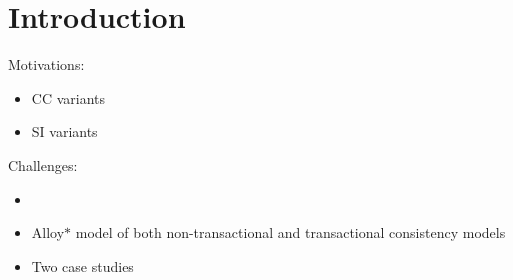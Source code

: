 
\section{Introduction} \label{section:intro}

Motivations:
\begin{itemize}
  \item CC variants
  \item SI variants
\end{itemize}

Challenges:
\begin{itemize}
  \item 
\end{itemize}


\begin{itemize}
  \item Alloy$\ast$ model of both non-transactional and transactional consistency models
  \item Two case studies
\end{itemize}
